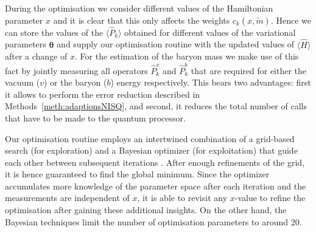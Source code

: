 \documentclass[twocolumn,aps,showpacs,prb,superscriptaddress,floatfix,10pt,nofootinbib]{revtex4-2}
\begin{document}
During the optimisation we consider different values of the Hamiltonian parameter $x$ and it is clear that this only affects the weights $c_k(x,\tilde{m})$. Hence we can store the values of the $\langle \hat{P}_k \rangle$ obtained for different values of the variational parameters $\boldsymbol{\theta}$ and supply our optimisation routine with the updated values of $\langle \hat{H} \rangle$ after a change of $x$. 
For the estimation of the baryon mass we make use of this fact by jointly measuring all operators $\hat{P}_k^v$ and $\hat{P}_k^b$ that are required for either the vacuum ($v$) or the baryon ($b$) energy respectively. This bears two advantages: first it allows to perform the error reduction described in Methods~\ref{meth:adaptionsNISQ}, and second, it reduces the total number of calls that have to be made to the quantum processor. 

Our optimisation routine employs an intertwined combination of a grid-based search (for exploration) and a Bayesian optimizer (for exploitation) that guide each other between subsequent iterations \cite{Frazier2018A-Tutorial}. After enough refinements of the grid, it is hence guaranteed to find the global minimum. Since the optimizer accumulates more knowledge of the parameter space after each iteration and the measurements are independent of $x$, it is able to revisit any $x$-value to refine the optimisation after gaining these additional insights. On the other hand, the Bayesian techniques limit the number of optimisation parameters to around 20.
\end{document}
